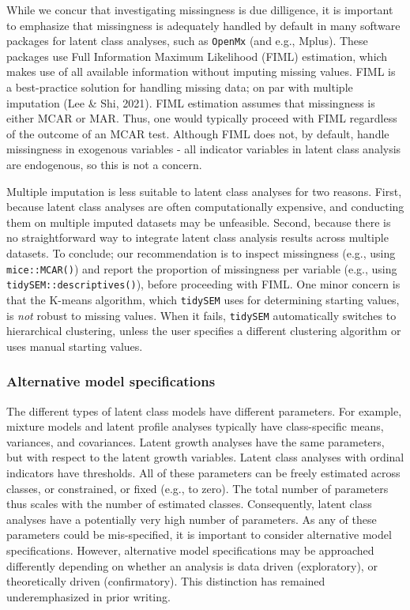 \documentclass[
  ,man]{apa6}
\begin{document}
While we concur that investigating missingness is due dilligence,
it is important to emphasize that missingness is adequately handled by default in many software packages for latent class analyses, such as \texttt{OpenMx} (and e.g., Mplus).
These packages use Full Information Maximum Likelihood (FIML) estimation,
which makes use of all available information without imputing missing values.
FIML is a best-practice solution for handling missing data; on par with multiple imputation (Lee \& Shi, 2021).
FIML estimation assumes that missingness is either MCAR or MAR.
Thus, one would typically proceed with FIML regardless of the outcome of an MCAR test.
Although FIML does not, by default, handle missingness in exogenous variables - all indicator variables in latent class analysis are endogenous, so this is not a concern.

Multiple imputation is less suitable to latent class analyses for two reasons.
First, because latent class analyses are often computationally expensive,
and conducting them on multiple imputed datasets may be unfeasible.
Second, because there is no straightforward way to integrate latent class analysis results across multiple datasets.
To conclude; our recommendation is to inspect missingness (e.g., using \texttt{mice::MCAR()})
and report the proportion of missingness per variable (e.g., using \texttt{tidySEM::descriptives()}),
before proceeding with FIML.
One minor concern is that the K-means algorithm,
which \texttt{tidySEM} uses for determining starting values,
is \emph{not} robust to missing values.
When it fails, \texttt{tidySEM} automatically switches to hierarchical clustering,
unless the user specifies a different
clustering algorithm or uses manual starting values.

\hypertarget{alternative-model-specifications}{%
\subsubsection{Alternative model specifications}\label{alternative-model-specifications}}

The different types of latent class models have different parameters.
For example, mixture models and latent profile analyses typically have class-specific means, variances, and covariances.
Latent growth analyses have the same parameters, but with respect to the latent growth variables.
Latent class analyses with ordinal indicators have thresholds.
All of these parameters can be freely estimated across classes, or constrained,
or fixed (e.g., to zero).
The total number of parameters thus scales with the number of estimated classes.
Consequently, latent class analyses have a potentially very high number of parameters.
As any of these parameters could be mis-specified,
it is important to consider alternative model specifications.
However, alternative model specifications may be approached differently depending on whether an analysis is data driven (exploratory), or theoretically driven (confirmatory).
This distinction has remained underemphasized in prior writing.
\end{document}
